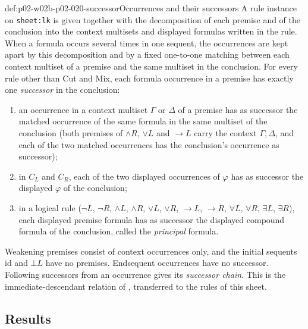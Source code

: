 \begin{hbconvention}{def:p02-w02b-p02-020-successor}{Occurrences and their successors}
A rule instance on \texttt{sheet:lk} is given together
with the decomposition of each premise and of the conclusion into the context
multisets and displayed formulas written in the rule.  When a formula occurs
several times in one sequent, the occurrences are kept apart by this
decomposition and by a fixed one-to-one matching between each context multiset
of a premise and the same multiset in the conclusion.  For every rule other
than Cut and Mix, each formula occurrence in a premise has exactly one
\emph{successor} in the conclusion:
\begin{enumerate}
  \item an occurrence in a context multiset \(\Gamma\) or \(\Delta\) of a
        premise has as successor the matched occurrence of the same formula in
        the same multiset of the conclusion (both premises of
        \(\land R\), \(\lor L\) and \(\to L\) carry the context
        \(\Gamma,\Delta\), and each of the two matched occurrences has the
        conclusion's occurrence as successor);
  \item in \(C_L\) and \(C_R\), each of the two displayed occurrences of
        \(\varphi\) has as successor the displayed \(\varphi\) of the
        conclusion;
  \item in a logical rule (\(\neg L\), \(\neg R\), \(\land L\), \(\land R\),
        \(\lor L\), \(\lor R\), \(\to L\), \(\to R\), \(\forall L\),
        \(\forall R\), \(\exists L\), \(\exists R\)), each displayed premise
        formula has as successor the displayed compound formula of the
        conclusion, called the \emph{principal} formula.
\end{enumerate}
Weakening premises consist of context occurrences only, and the initial
sequents \(\mathrm{id}\) and \(\bot L\) have no premises.  Endsequent
occurrences have no successor.  Following successors from an occurrence gives
its \emph{successor chain}.  This is the immediate-descendant relation of
\cite[\S1.2.3, p.~12]{Buss1998Intro}, transferred to the rules of this sheet.
\end{hbconvention}

\subsection{Results}
\label{sec:p02-w02b-p02-020-results}

